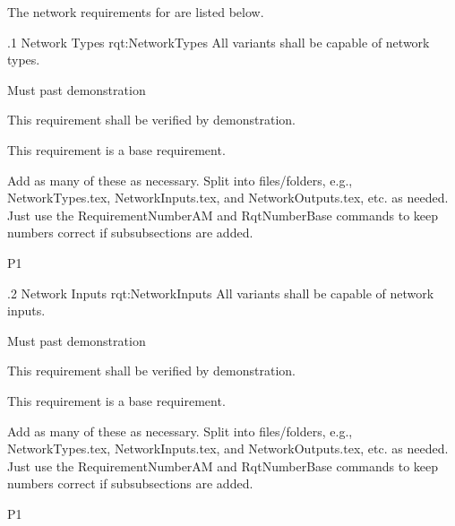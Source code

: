 The network requirements for \ThisSystem are listed below.


\ONERQMTVKPP
{\RqtNumberBase.1}
{Network Types}
{rqt:NetworkTypes}
{All \ThisSys variants shall be capable of \TBD network types.}
{
	\item [Phase 1] Must past demonstration
}
{This requirement shall be verified by demonstration.}
{
	\item [N/A] This requirement is a base requirement.
}
{
  \item Add as many of these as necessary.  Split into files/folders, e.g., NetworkTypes.tex, NetworkInputs.tex, and NetworkOutputs.tex, etc. as needed. Just use the RequirementNumberAM and RqtNumberBase commands to keep numbers correct if subsubsections are added.
}
{P1}


\ONERQMTVKPP
{\RqtNumberBase.2}
{Network Inputs}
{rqt:NetworkInputs}
{All \ThisSys variants shall be capable of \TBD network inputs.}
{
	\item [Phase 1] Must past demonstration
}
{This requirement shall be verified by demonstration.}
{
	\item [N/A] This requirement is a base requirement.
}
{
  \item Add as many of these as necessary.  Split into files/folders, e.g., NetworkTypes.tex, NetworkInputs.tex, and NetworkOutputs.tex, etc. as needed. Just use the RequirementNumberAM and RqtNumberBase commands to keep numbers correct if subsubsections are added.
}
{P1}

